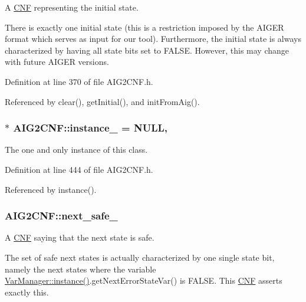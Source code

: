A \hyperlink{classCNF}{C\-N\-F} representing the initial state. 

There is exactly one initial state (this is a restriction imposed by the A\-I\-G\-E\-R format which serves as input for our tool). Furthermore, the initial state is always characterized by having all state bits set to F\-A\-L\-S\-E. However, this may change with future A\-I\-G\-E\-R versions. 

Definition at line 370 of file A\-I\-G2\-C\-N\-F.\-h.



Referenced by clear(), get\-Initial(), and init\-From\-Aig().

\hypertarget{classAIG2CNF_ae298ae4804c63f5bac4dfab7528d35ad}{
\subsubsection[{instance\-\_\-}]{ $\ast$ A\-I\-G2\-C\-N\-F\-::instance\-\_\- = N\-U\-L\-L\hspace{0.3cm}{\ttfamily [static]}, {\ttfamily [private]}}}\label{classAIG2CNF_ae298ae4804c63f5bac4dfab7528d35ad}


The one and only instance of this class. 



Definition at line 444 of file A\-I\-G2\-C\-N\-F.\-h.



Referenced by instance().

\hypertarget{classAIG2CNF_a057c6a3159253267c99f115b7d724ee2}{
\subsubsection[{next\-\_\-safe\-\_\-}]{ A\-I\-G2\-C\-N\-F\-::next\-\_\-safe\-\_\-\hspace{0.3cm}{\ttfamily [protected]}}}\label{classAIG2CNF_a057c6a3159253267c99f115b7d724ee2}


A \hyperlink{classCNF}{C\-N\-F} saying that the next state is safe. 

The set of safe next states is actually characterized by one single state bit, namely the next states where the variable \hyperlink{classVarManager_ac1a84b367c26dfc5ee9e612f7d61b288}{Var\-Manager\-::instance()}.get\-Next\-Error\-State\-Var() is F\-A\-L\-S\-E. This \hyperlink{classCNF}{C\-N\-F} asserts exactly this. 

